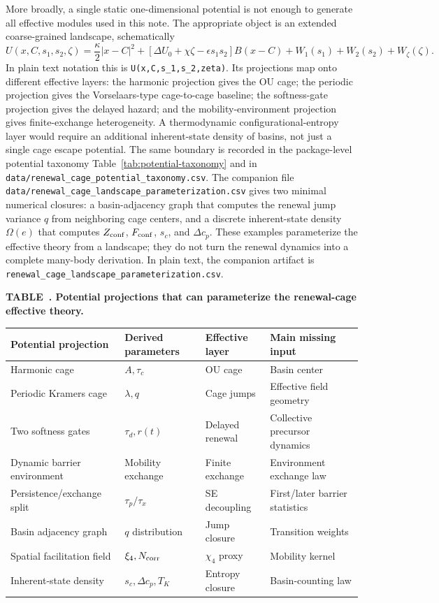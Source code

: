 \documentclass[aps,preprint,onecolumn,superscriptaddress,nofootinbib]{revtex4-2}
\begin{document}
More broadly, a single static one-dimensional potential is not enough to
generate all effective modules used in this note. The appropriate object is an
extended coarse-grained landscape, schematically
\begin{equation}
  U(x,C,s_1,s_2,\zeta)
  =
  \frac{\kappa}{2}|x-C|^2
  +[\Delta U_0+\chi\zeta-\epsilon s_1s_2]B(x-C)
  +W_1(s_1)+W_2(s_2)+W_\zeta(\zeta).
\end{equation}
In plain text notation this is \verb|U(x,C,s_1,s_2,zeta)|. Its projections map onto
different effective layers: the harmonic projection gives the OU cage; the
periodic projection gives the Vorselaars-type cage-to-cage baseline; the
softness-gate projection gives the delayed hazard; and the mobility-environment projection gives finite-exchange heterogeneity. A thermodynamic
configurational-entropy layer would require an additional inherent-state
density of basins, not just a single cage escape potential.
The same boundary is recorded in the package-level potential taxonomy
Table~\ref{tab:potential-taxonomy} and in
\texttt{data/renewal\_cage\_potential\_taxonomy.csv}.
The companion file
\texttt{data/renewal\_cage\_landscape\_parameterization.csv} gives two
minimal numerical closures: a basin-adjacency graph that computes the renewal
jump variance $q$ from neighboring cage centers, and a discrete
inherent-state density $\Omega(e)$ that computes
$Z_{\rm conf}$, $F_{\rm conf}$, $s_c$, and $\Delta c_p$. These examples
parameterize the effective theory from a landscape; they do not turn the
renewal dynamics into a complete many-body derivation.
In plain text, the companion artifact is \verb|renewal_cage_landscape_parameterization.csv|.

\begin{center}
\label{tab:potential-taxonomy}
\textbf{TABLE~\thetable. Potential projections that can parameterize the
renewal-cage effective theory.}

\begin{tabular}{llll}
Potential projection & Derived parameters & Effective layer & Main missing input \\
\hline
Harmonic cage & $A,\tau_c$ & OU cage & Basin center \\
Periodic Kramers cage & $\lambda,q$ & Cage jumps & Effective field geometry \\
Two softness gates & $\tau_d,r(t)$ & Delayed renewal & Collective precursor dynamics \\
Dynamic barrier environment & Mobility exchange & Finite exchange & Environment exchange law \\
Persistence/exchange split & $\tau_p/\tau_x$ & SE decoupling & First/later barrier statistics \\
Basin adjacency graph & $q$ distribution & Jump closure & Transition weights \\
Spatial facilitation field & $\xi_4,N_{\rm corr}$ & $\chi_4$ proxy & Mobility kernel \\
Inherent-state density & $s_c,\Delta c_p,T_K$ & Entropy closure & Basin-counting law \\
\end{tabular}
\end{center}
\end{document}
